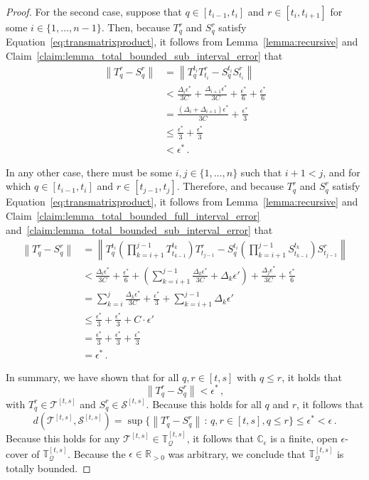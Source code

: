 \documentclass[10pt]{paper}
\theoremstyle{definition}
\newcommand{\reals}{\mathbb{R}}
\newcommand{\realspos}{\reals_{>0}}
\newcommand{\rateset}{\mathcal{Q}}
\newcommand{\norm}[1]{\left\lVert #1 \right\rVert}
\begin{document}
\begin{proof}
For the second case, suppose that $q\in[t_{i-1},t_i]$ and $r\in[t_i,t_{i+1}]$ for some $i\in\{1,\ldots,n-1\}$. Then, because $T_q^r$ and $S_q^r$ satisfy Equation~\eqref{eq:transmatrixproduct}, it follows from Lemma~\ref{lemma:recursive} and Claim~\ref{claim:lemma_total_bounded_sub_interval_error} that
\begin{align*}
\norm{T_q^r - S_q^r} &= \norm{T_q^{t_i}T_{t_i}^r - S_q^{t_i}S_{t_i}^r} \\
 &< \frac{\Delta_i\epsilon^*}{3C} + \frac{\Delta_{i+1}\epsilon^*}{3C} + \frac{\epsilon^*}{6} + \frac{\epsilon^*}{6} \\
 &= \frac{(\Delta_i+\Delta_{i+1})\epsilon^*}{3C} + \frac{\epsilon^*}{3} \\
 &\leq \frac{\epsilon^*}{3} + \frac{\epsilon^*}{3}\\
 &< \epsilon^*\,.
\end{align*}

In any other case, there must be some $i,j\in\{1,\ldots,n\}$ such that $i+1<j$, and for which $q\in[t_{i-1},t_i]$ and $r\in[t_{j-1},t_j]$. Therefore, and because $T_q^r$ and $S_q^r$ satisfy Equation~\eqref{eq:transmatrixproduct}, it follows from Lemma~\ref{lemma:recursive} and Claim~\ref{claim:lemma_total_bounded_full_interval_error} and~\ref{claim:lemma_total_bounded_sub_interval_error} that
\begin{align*}
\norm{T_q^r - S_q^r} &= \norm{T_q^{t_i}\left(\prod_{k=i+1}^{j-1}T_{t_{k-1}}^{t_k}\right)T_{t_{j-1}}^r - S_q^{t_i}\left(\prod_{k=i+1}^{j-1}S_{t_{k-1}}^{t_k}\right)S_{t_{j-1}}^r} \\
 &< \frac{\Delta_i\epsilon^*}{3C} + \frac{\epsilon^*}{6} + \left(\sum_{k=i+1}^{j-1}\frac{\Delta_k\epsilon^*}{3C} + \Delta_k\epsilon'\right) + \frac{\Delta_{j}\epsilon^*}{3C} + \frac{\epsilon^*}{6} \\
 &= \sum_{k=i}^j \frac{\Delta_k\epsilon^*}{3C} + \frac{\epsilon^*}{3} + \sum_{k=i+1}^{j-1}{\Delta_k\epsilon'} \\
 &\leq \frac{\epsilon^*}{3} + \frac{\epsilon^*}{3} + C\cdot\epsilon' \\
 &= \frac{\epsilon^*}{3} + \frac{\epsilon^*}{3} + \frac{\epsilon^*}{3} \\
 &= \epsilon^*\,.
\end{align*}

In summary, we have shown that for all $q,r\in[t,s]$ with $q\leq r$, it holds that
\begin{equation*}
\norm{T_q^r - S_q^r} < \epsilon^*\,,
\end{equation*}
with $T_q^r\in\mathcal{T}^{[t,s]}$ and $S_q^r\in\mathcal{S}^{[t,s]}$. Because this holds for all $q$ and $r$, it follows that
\begin{equation*}
d(\mathcal{T}^{[t,s]},\mathcal{S}^{[t,s]}) = \sup\{\norm{T_q^r - S_q^r}\,:\,q,r\in[t,s], q\leq r\} \leq \epsilon^* < \epsilon\,.
\end{equation*}
Because this holds for any $\mathcal{T}^{[t,s]}\in\mathbb{T}_\rateset^{[t,s]}$, it follows that $\mathbb{C}_\epsilon$ is a finite, open $\epsilon$-cover of $\mathbb{T}_\rateset^{[t,s]}$. Because the $\epsilon\in\realspos$ was arbitrary, we conclude that $\mathbb{T}_\rateset^{[t,s]}$ is totally bounded.
\end{proof}
\end{document}
